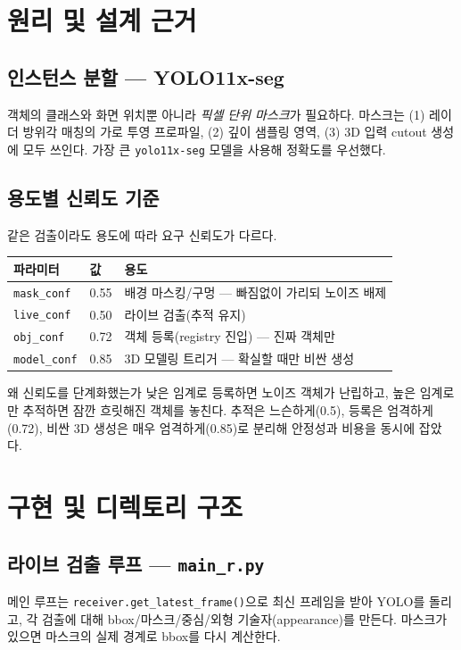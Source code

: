 \begin{statusdone}\end{statusdone}

\chapter{원리 및 설계 근거}

\section{인스턴스 분할 — YOLO11x-seg}
객체의 클래스와 화면 위치뿐 아니라 \emph{픽셀 단위 마스크}가 필요하다. 마스크는
(1) 레이더 방위각 매칭의 가로 투영 프로파일, (2) 깊이 샘플링 영역, (3) 3D 입력
cutout 생성에 모두 쓰인다. 가장 큰 \texttt{yolo11x-seg} 모델을 사용해 정확도를
우선했다.

\section{용도별 신뢰도 기준}
같은 검출이라도 용도에 따라 요구 신뢰도가 다르다.
\begin{center}
\begin{tabular}{@{}llp{6.5cm}@{}}
\toprule
파라미터 & 값 & 용도 \\
\midrule
\texttt{mask\_conf} & 0.55 & 배경 마스킹/구멍 — 빠짐없이 가리되 노이즈 배제 \\
\texttt{live\_conf} & 0.50 & 라이브 검출(추적 유지) \\
\texttt{obj\_conf}  & 0.72 & 객체 등록(registry 진입) — 진짜 객체만 \\
\texttt{model\_conf}& 0.85 & 3D 모델링 트리거 — 확실할 때만 비싼 생성 \\
\bottomrule
\end{tabular}
\end{center}

\begin{designbox}{왜 신뢰도를 단계화했는가}
낮은 임계로 등록하면 노이즈 객체가 난립하고, 높은 임계로만 추적하면 잠깐
흐릿해진 객체를 놓친다. 추적은 느슨하게(0.5), 등록은 엄격하게(0.72), 비싼 3D
생성은 매우 엄격하게(0.85)로 분리해 안정성과 비용을 동시에 잡았다.
\end{designbox}

\chapter{구현 및 디렉토리 구조}

\section{라이브 검출 루프 — \texttt{main\_r.py}}
메인 루프는 \texttt{receiver.get\_latest\_frame()}으로 최신 프레임을 받아
YOLO를 돌리고, 각 검출에 대해 bbox/마스크/중심/외형 기술자(appearance)를 만든다.
마스크가 있으면 마스크의 실제 경계로 bbox를 다시 계산한다.

